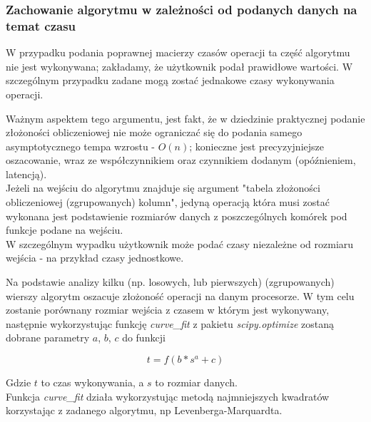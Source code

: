 \documentclass[brudnopis]{xmgr}
\begin{document}
\subsubsection{Zachowanie algorytmu w zależności od podanych danych na temat czasu}


W przypadku podania poprawnej macierzy czasów operacji ta część algorytmu nie jest wykonywana; zakładamy, że użytkownik podał prawidłowe wartości.
W szczególnym przypadku zadane mogą zostać jednakowe czasy wykonywania operacji.


Ważnym aspektem tego argumentu, jest fakt, że w dziedzinie praktycznej podanie złożoności obliczeniowej nie może ograniczać się do podania samego asymptotycznego tempa wzrostu - $O(n)$; konieczne jest precyzyjniejsze oszacowanie, wraz ze współczynnikiem oraz czynnikiem dodanym (opóźnieniem, latencją).
\medskip\\

Jeżeli na wejściu do algorytmu znajduje się argument "tabela złożoności obliczeniowej (zgrupowanych) kolumn", jedyną operacją która musi zostać wykonana jest podstawienie rozmiarów danych z poszczególnych komórek pod funkcje podane na wejściu.
\medskip\\

W szczególnym wypadku użytkownik może podać czasy niezależne od rozmiaru wejścia - na przykład czasy jednostkowe.
\medskip\\


Na podstawie analizy kilku (np. losowych, lub pierwszych) (zgrupowanych) wierszy algorytm oszacuje złożoność operacji na danym procesorze.
W tym celu zostanie porównany rozmiar wejścia z czasem w którym jest wykonywany, następnie wykorzystując funkcję \emph{curve\_fit} z pakietu \emph{scipy.optimize} zostaną dobrane parametry $a$, $b$, $c$ do funkcji

$$t = f(b * s^a + c)$$

Gdzie $t$ to czas wykonywania, a $s$ to rozmiar danych.
\medskip\\

Funkcja \emph{curve\_fit} działa wykorzystując metodą najmniejszych kwadratów korzystając z zadanego algorytmu, np Levenberga-Marquardta.
\medskip\\
\end{document}
